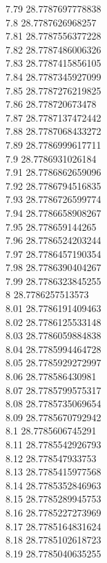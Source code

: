 {7.79	28.7787697778838\\
7.8	28.7787626968257\\
7.81	28.7787556377228\\
7.82	28.7787486006326\\
7.83	28.7787415856105\\
7.84	28.7787345927099\\
7.85	28.7787276219825\\
7.86	28.778720673478\\
7.87	28.7787137472442\\
7.88	28.7787068433272\\
7.89	28.7786999617711\\
7.9	28.7786931026184\\
7.91	28.7786862659096\\
7.92	28.7786794516835\\
7.93	28.7786726599774\\
7.94	28.7786658908267\\
7.95	28.778659144265\\
7.96	28.7786524203244\\
7.97	28.7786457190354\\
7.98	28.7786390404267\\
7.99	28.7786323845255\\
8	28.7786257513573\\
8.01	28.7786191409463\\
8.02	28.7786125533148\\
8.03	28.7786059884838\\
8.04	28.7785994464728\\
8.05	28.7785929272997\\
8.06	28.778586430981\\
8.07	28.7785799575317\\
8.08	28.7785735069654\\
8.09	28.7785670792942\\
8.1	28.7785606745291\\
8.11	28.7785542926793\\
8.12	28.778547933753\\
8.13	28.7785415977568\\
8.14	28.7785352846963\\
8.15	28.7785289945753\\
8.16	28.7785227273969\\
8.17	28.7785164831624\\
8.18	28.7785102618723\\
8.19	28.7785040635255\\
}
